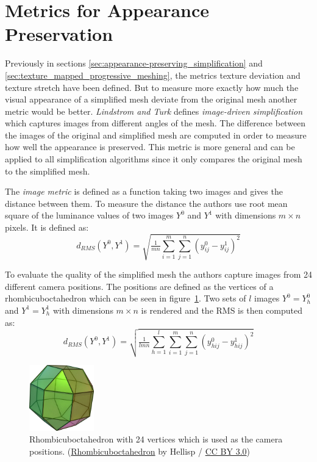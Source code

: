 \section{Metrics for Appearance Preservation} \label{sec:metrics_for_appearance_preservation}
Previously in sections \ref{sec:appearance-preserving_simplification} and \ref{sec:texture_mapped_progressive_meshing}, the metrics texture deviation and texture stretch have been defined. But to measure more exactly how much the visual appearance of a simplified mesh deviate from the original mesh another metric would be better. \emph{Lindstrom and Turk} \cite{lindstrom2000image} defines \emph{image-driven simplification} which captures images from different angles of the mesh. The difference between the images of the original and simplified mesh are computed in order to measure how well the appearance is preserved. This metric is more general and can be applied to all simplification algorithms since it only compares the original mesh to the simplified mesh.

The \emph{image metric} is defined as a function taking two images and gives the distance between them. To measure the distance the authors use root mean square of the luminance values of two images $Y^0$ and $Y^1$ with dimensions $m \times n$ pixels. It is defined as:
\begin{equation} \label{eq:rms_images}
  d_{RMS}(Y^0,Y^1) = \sqrt{\tfrac{1}{mn}\sum^m_{i=1}\sum^n_{j=1}(y^0_{ij} - y^1_{ij})^2}
\end{equation}

To evaluate the quality of the simplified mesh the authors capture images from 24 different camera positions. The positions are defined as the vertices of a rhombicuboctahedron which can be seen in figure~\ref{fig:rhombicuboctahedron}. Two sets of $l$ images $Y^0 = {Y^0_h}$ and $Y^1 = {Y^1_h}$ with dimensions $m \times n$ is rendered and the RMS is then computed as:
\begin{equation}  \label{eq:rms_image_sets}
  d_{RMS}(Y^0,Y^1) = \sqrt{\tfrac{1}{lmn}\sum^l_{h=1}\sum^m_{i=1}\sum^n_{j=1}(y^0_{hij} - y^1_{hij})^2}
\end{equation}

\begin{figure}[h]
    \centering
    \includegraphics[width=0.25\textwidth]{figures/591px-Rhombicuboctahedron.jpg}
    \caption{Rhombicuboctahedron with 24 vertices which is used as the camera positions. 
      (\href{https://commons.wikimedia.org/wiki/File:Rhombicuboctahedron.jpg}{Rhombicuboctahedron} by Hellisp / \href{https://creativecommons.org/licenses/by/3.0/}{CC BY 3.0})}
    \label{fig:rhombicuboctahedron}
\end{figure}


